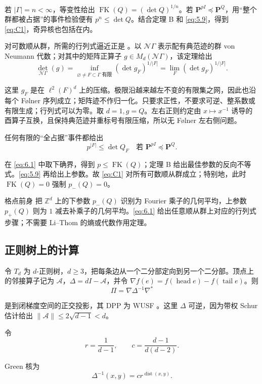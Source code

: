 \documentclass[UTF8,zihao=-4,a4paper]{ctexart}
\numberwithin{equation}{section}
\begin{document}
若 \(|\Gamma|=n<\infty\)，等变性给出
\(\operatorname{FK}(Q)=(\det Q)^{1/n}\)。若
\(\mathbf P^{pI}\preceq\mathbf P^Q\)，用“整个群都被占据”的事件检验便有
\(p^n\le\det Q\)。结合定理 B 和 \eqref{eq:5.9}，得到 \eqref{eq:C1}，奇异核也包括在内。

对可数顺从群，所需的行列式逼近正是 \cite[Theorem 1.4]{LiT}。以 \(\mathcal N\Gamma\) 表示配有典范迹的群 von Neumann 代数；对其中的矩阵正算子 \(g\in M_d(\mathcal N\Gamma)\)，该定理给出
\[
\det_{\mathcal N\Gamma}(g)
=\inf_{\varnothing\ne F\subset\Gamma\text{ 有限}}
      (\det g_F)^{1/|F|}
=\lim_F(\det g_F)^{1/|F|}.
\tag{6.1}\label{eq:6.1}
\]

这里 \(g_F\) 是在 \(\ell^2(F)^d\) 上的压缩。极限沿越来越左不变的有限集之网，因此也沿每个 Følner 序列成立；矩阵迹不作归一化。只要求正性，不要求可逆、整系数或有限生成；行列式可以为零。取 \(d=1,g=Q\)。左右正则约定由 \(x\mapsto x^{-1}\) 诱导的酉算子互换，且保持典范迹并重标号有限压缩，所以无 Følner 左右侧问题。

任何有限的“全占据”事件都给出
\[
p^{|F|}\le\det Q_F
\quad\text{若 }\mathbf P^{pI}\preceq\mathbf P^Q.
\]

在 \eqref{eq:6.1} 中取下确界，得到 \(p\le\operatorname{FK}(Q)\)；定理 B 给出最佳参数的反向不等式。\eqref{eq:5.9} 再给出上参数。故 \eqref{eq:C1} 对所有可数顺从群成立；特别地，此时
\(\operatorname{FK}(Q)=0\) 强制 \(p_-(Q)=0\)。

格点前身 \cite[Theorem 5.11]{LS} 把 \(\mathbb Z^d\) 上的下参数 \(p_-(Q)\) 识别为 Fourier 乘子的几何平均，上参数 \(p_+(Q)\) 则为 \(1\) 减去补乘子的几何平均。\eqref{eq:6.1} 给出任意顺从群上对应的行列式步骤；不需要 Li--Thom 的熵或代数作用定理。

\subsection{正则树上的计算}

令 \(T_d\) 为 \(d\)-正则树，\(d\ge3\)，把每条边从一个二分部定向到另一个二分部。顶点上的邻接算子记为 \(\mathcal A\)，\(\Delta=dI-\mathcal A\)，并令
\(\nabla f(e)=f(\operatorname{head}e)-f(\operatorname{tail}e)\)。则
\[
\Pi=\nabla\Delta^{-1}\nabla^*
\tag{6.2}\label{eq:6.2}
\]

是到闭梯度空间的正交投影，其 DPP 为 WUSF \cite[Theorem 7.8]{BLPS}。这里 \(\Delta\) 可逆，因为带权 Schur 估计给出
\(\|\mathcal A\|\le2\sqrt{d-1}<d\)。

令
\[
r=\frac1{d-1},\qquad c=\frac{d-1}{d(d-2)}.
\]

Green 核为
\[
\Delta^{-1}(x,y)=cr^{\operatorname{dist}(x,y)}.
\tag{6.3}\label{eq:6.3}
\]
\end{document}
